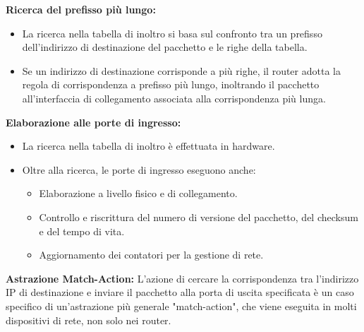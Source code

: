 \textbf{Ricerca del prefisso più lungo:}
\begin{itemize}
    \item La ricerca nella tabella di inoltro si basa sul confronto tra un prefisso dell'indirizzo di destinazione del pacchetto e le righe della tabella.
    \item Se un indirizzo di destinazione corrisponde a più righe, il router adotta la regola di corrispondenza a prefisso più lungo, inoltrando il pacchetto all'interfaccia di collegamento associata alla corrispondenza più lunga.
\end{itemize}

\textbf{Elaborazione alle porte di ingresso:}
\begin{itemize}
    \item La ricerca nella tabella di inoltro è effettuata in hardware.
    \item Oltre alla ricerca, le porte di ingresso eseguono anche:
        \begin{itemize}
            \item Elaborazione a livello fisico e di collegamento.
            \item Controllo e riscrittura del numero di versione del pacchetto, del checksum e del tempo di vita.
            \item Aggiornamento dei contatori per la gestione di rete.
        \end{itemize}
\end{itemize}

\textbf{Astrazione Match-Action:}
L'azione di cercare la corrispondenza tra l'indirizzo IP di destinazione e inviare il pacchetto alla porta di uscita specificata è un caso specifico di un'astrazione più generale "match-action", che viene eseguita in molti dispositivi di rete, non solo nei router.


